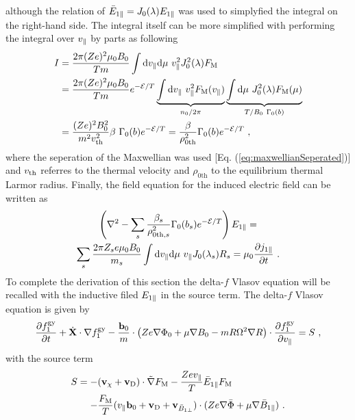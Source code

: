 although the relation of $\bar{E}_{1\parallel} = J_0(\lambda) E_{1\parallel}$ was used to simplyfied the integral on the right-hand side. The integral itself can be more simplified with performing the integral over $v_\parallel$ by parts as following
\begin{gather}
	\begin{aligned}
		I &= \frac{2\pi (Ze)^2 \mu_0 B_0}{Tm}  \int \mathrm{d}v_\parallel\mathrm{d}\mu ~ v_\parallel^2 J_0^2(\lambda) F_\mathrm{M} \\
		  &= \frac{2\pi (Ze)^2 \mu_0 B_0}{Tm} e^{-\mathcal{E}/T} \underbrace{\int \mathrm{d}v_\parallel ~ v_\parallel^2 F_\mathrm{M}(v_\parallel)}_{n_0/2\pi} \underbrace{\int \mathrm{d}\mu ~ J_0^2(\lambda) F_\mathrm{M}(\mu)}_{T/B_0~\Gamma_0(b)} \\
		  &= \frac{(Ze)^2 B_0^2}{m^2 v_{\mathrm{th}}^2} \beta ~ \Gamma_0(b) e^{-\mathcal{E}/T} = \frac{\beta}{\rho^2_{0\mathrm{th}}} \Gamma_0(b) e^{-\mathcal{E}/T} ~,
	\end{aligned}
\end{gather}
where the seperation of the Maxwellian was used [Eq. (\ref{eq:maxwellianSeperated})] and $v_{\mathrm{th}}$ referres to the thermal velocity and $\rho_{0\mathrm{th}}$ to the equilibrium thermal Larmor radius. Finally, the field equation for the induced electric field can be written as
\begin{gather}
	\left(\nabla^2 - \sum_s \frac{\beta_s}{\rho^2_{0\mathrm{th},s}} \Gamma_0(b_s) e^{-\mathcal{E}/T} \right) E_{1\parallel} = \\
	\sum_s \frac{2\pi Z_se \mu_0 B_0}{m_s}  \int \mathrm{d}v_\parallel\mathrm{d}\mu ~ v_\parallel J_0(\lambda_s) R_s = \mu_0 \frac{\partial j_{1\parallel}}{\partial t}~.
	\label{eq:fieldElectric}
\end{gather}
To complete the derivation of this section the delta-\!$f$ Vlasov equation will be recalled with the inductive filed $E_{1\parallel}$ in the source term. The delta-\!$f$ Vlasov equation is given by
\begin{gather}
	\frac{\partial f_1^{\mathrm{gy}}}{\partial t} + \dot{\boldsymbol{\mathbf{X}}} \cdot \nabla f_1^{\mathrm{gy}} - \frac{\boldsymbol{\mathbf{b}}_0}{m} \cdot \left(Ze\nabla \Phi_0 + \mu \nabla B_0 - mR \Omega^2 \nabla R \right) \cdot \frac{\partial f_1^{\mathrm{gy}}}{\partial v_\parallel} = S~,
	\label{eq:gyrocenterDeltafSubVlasovRecall}
\end{gather}
with the source term
\begin{gather}
	\begin{aligned}
		S = -& (\boldsymbol{\mathbf{v}}_\chi + \boldsymbol{\mathbf{v}}_\mathrm{D}) \cdot \tilde{\nabla} F_\mathrm{M} - \frac{Z e v_\parallel}{T} \bar{E}_{1\parallel} F_\mathrm{M} \\
		    -& \frac{F_\mathrm{M}}{T} (v_\parallel \boldsymbol{\mathbf{b}}_0 + \boldsymbol{\mathbf{v}}_\mathrm{D} + \boldsymbol{\mathbf{v}}_{\bar{B}_{1\perp}}) \cdot (Z e \nabla \bar{\Phi} + \mu \nabla \bar{B}_{1\parallel})~.
	\end{aligned}
	\label{eq:sourceTermIndElectric}
\end{gather}

